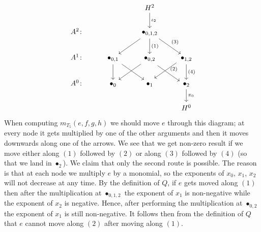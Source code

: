 \documentclass[10pt,a4paper]{amsart}
\numberwithin{equation}{section}
\begin{document}
\[\begin{tikzcd}
&&H^2\arrow{d}{\iota_2}&\\
	A^2\colon &&\bullet_{0,1,2}\arrow{dl}{}\arrow{d}{(1)}\arrow{dr}{(3)}&\\
	A^1\colon &\bullet_{0,1}\arrow{d}{}\arrow{dr}{}&\bullet_{0,2}\arrow{dl}{}\arrow[shift right]{dr}{(2)}&\bullet_{1,2}\arrow[shift right]{dl}{}\arrow{d}{(4)}\\
	A^0\colon &\bullet_0&\bullet_1&\bullet_2\arrow{d}{\pi_0}\\
	&&&H^0
\end{tikzcd}
\]
When computing $m_{T_5}(e,f,g,h)$ we should move $e$ through this diagram; at every node it gets multiplied by one of the other arguments and then it moves downwards along one of the arrows. We see that we get non-zero result if we move either along $(1)$ followed by $(2)$ or along $(3)$ followed by $(4)$ (so that we land in $\bullet_2$).
We claim that only the second route is possible. The reason is that at each node we multiply $e$ by a monomial, so the exponents of $x_0$, $x_1$, $x_2$ will not decrease at any time. By the definition of $Q$, if $e$ gets moved along $(1)$ then after the multiplication at $\bullet_{0,1,2}$
the exponent of $x_1$ is non-negative while the exponent of $x_2$ is negative. Hence, after performing the multiplication at $\bullet_{0,2}$ the exponent of $x_1$ is still non-negative.
It follows then from the definition of $Q$ that $e$ cannot move along $(2)$ after moving along $(1)$.
\end{document}
